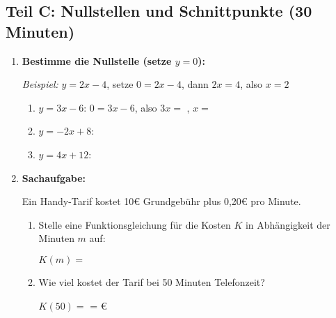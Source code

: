 \subsection*{Teil C: Nullstellen und Schnittpunkte (30 Minuten)}

\begin{enumerate}[label=\arabic*., resume]

    \item \textbf{Bestimme die Nullstelle (setze $y = 0$):}
    \vspace{0.5cm}

    \textit{Beispiel:} $y = 2x - 4$, setze $0 = 2x - 4$, dann $2x = 4$, also $x = 2$

    \begin{enumerate}[label=\alph*)]
        \item $y = 3x - 6$: $0 = 3x - 6$, also $3x =$ \underline{\hspace{1cm}}, $x =$ \underline{\hspace{1cm}}
        \vspace{0.5cm}
        \item $y = -2x + 8$: \underline{\hspace{6cm}}
        \vspace{0.5cm}
        \item $y = 4x + 12$: \underline{\hspace{6cm}}
    \end{enumerate}

    \vspace{1cm}

    \item \textbf{Sachaufgabe:}
    \vspace{0.5cm}

    Ein Handy-Tarif kostet 10€ Grundgebühr plus 0,20€ pro Minute.

    \begin{enumerate}[label=\alph*)]
        \item Stelle eine Funktionsgleichung für die Kosten $K$ in Abhängigkeit der Minuten $m$ auf:
        \vspace{0.3cm}

        $K(m) =$ \underline{\hspace{4cm}}

        \item Wie viel kostet der Tarif bei 50 Minuten Telefonzeit?
        \vspace{0.3cm}

        $K(50) =$ \underline{\hspace{4cm}} = \underline{\hspace{2cm}}€


\end{enumerate}
\end{enumerate}
